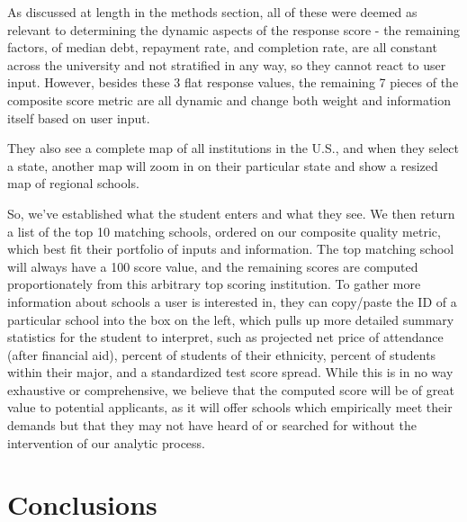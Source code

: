 \documentclass{article}\usepackage[]{graphicx}\usepackage[]{color}
\begin{document}
As discussed at length in the methods section, all of these were deemed as relevant to determining the dynamic aspects of the response score - the remaining factors, of median debt, repayment rate, and completion rate, are all constant across the university and not stratified in any way, so they cannot react to user input. However, besides these 3 flat response values, the remaining 7 pieces of the composite score metric are all dynamic and change both weight and information itself based on user input.\newline

They also see a complete map of all institutions in the U.S., and when they select a state, another map will zoom in on their particular state and show a resized map of regional schools.\newline

So, we've established what the student enters and what they see. We then return a list of the top 10 matching schools, ordered on our composite quality metric, which best fit their portfolio of inputs and information. The top matching school will always have a 100 score value, and the remaining scores are computed proportionately from this arbitrary top scoring institution. To gather more information about schools a user is interested in, they can copy/paste the ID of a particular school into the box on the left, which pulls up more detailed summary statistics for the student to interpret, such as projected net price of attendance (after financial aid), percent of students of their ethnicity, percent of students within their major, and a standardized test score spread. While this is in no way exhaustive or comprehensive, we believe that the computed score will be of great value to potential applicants, as it will offer schools which empirically meet their demands but that they may not have heard of or searched for without the intervention of our analytic process. 

\maketitle
\section{Conclusions}
\end{document}
